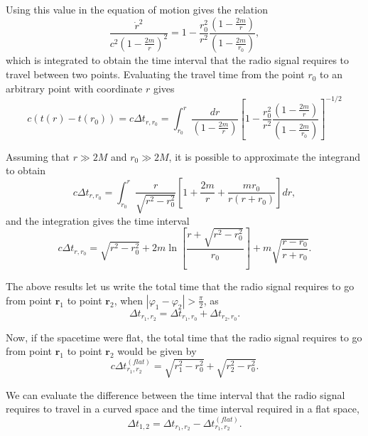 Using this value in the equation of motion gives the relation
\begin{equation}
\frac{ \dot{r}^2}{c^2\left( 1 - \frac{2m}{r}\right)^2}  =1 - \frac{r_0 ^2}{r^2} \frac{ \left( 1 - \frac{2m}{r}\right)}{\left( 1 - \frac{2m}{r_0}\right)} ,
\end{equation}
which is integrated to obtain the time interval that the radio signal requires to travel between two points. Evaluating the travel time from the point $r_0$ to an arbitrary point with coordinate $r$ gives
\begin{equation}
c\left( t(r) - t(r_0) \right) =  c\Delta t_{r,r_0}= \int_{r_0}^{r} \frac{ dr}{\left( 1 - \frac{2m}{r}\right)}\left[ 1 - \frac{r_0 ^2}{r^2} \frac{ \left( 1 - \frac{2m}{r}\right)}{\left( 1 - \frac{2m}{r_0}\right)} \right]^{-1/2}
\end{equation}

Assuming that $r \gg 2M$ and $r_0 \gg 2M$, it is possible to approximate the integrand to obtain
\begin{equation}
c\Delta t_{r,r_0} = \int_{r_0}^{r}  \frac{r}{\sqrt{r^2 - r_0^2}} \left[ 1 + \frac{2m}{r}  + \frac{mr_0}{r(r+r_0)}  \right] dr,
\end{equation}
and the integration gives the time interval
\begin{equation}
c\Delta t_{r,r_0} =\sqrt{r^2 - r_0^2} + 2m \ln \left[ \frac{r+\sqrt{r^2-r_0^2}}{r_0} \right] + m\sqrt{\frac{r-r_0}{r+r_0}}.
\end{equation}

The above results let us write the total time that the radio signal requires to go from point $\textbf{r}_1$ to point $\textbf{r}_2$, when $\left| \varphi_1 - \varphi_2 \right| > \frac{\pi}{2}$,  as
\begin{equation}
\Delta t_{r_1,r_2} = \Delta t_{r_1,r_0} + \Delta t_{r_2,r_0}.
\end{equation}

Now, if the spacetime were flat, the total time that the radio signal requires to go from point $\textbf{r}_1$ to point $\textbf{r}_2$ would be given by
\begin{equation}
c \Delta t^{(flat)}_{r_1, r_2} = \sqrt{r_1^2 - r_0^2} + \sqrt{r_2^2 - r_0^2}.
\end{equation}

We can evaluate the difference between the time interval that the radio signal requires to travel in a curved space and the time interval required in a flat space,
\begin{equation}
\Delta t_{1,2} = \Delta t_{r_1,r_2} - \Delta t^{(flat)}_{r_1, r_2}.
\end{equation}

